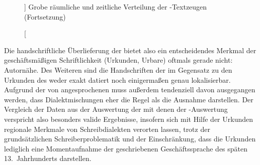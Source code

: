 \begin{figure}
\ContinuedFloat
{}
\caption%
	[]
	{Grobe räumliche und zeitliche Verteilung der \KC{}-Textzeugen
		(Fortsetzung)\nocite{wiesinger1983:rede}
	}
\end{figure}

Die handschriftliche Überlieferung der \KC{} bietet also ein
entscheidendes Merkmal der geschäftsmäßigen Schriftlichkeit (Urkunden, Urbare)
oftmals gerade nicht: Autornähe. Des Weiteren sind die Handschriften der
\KC{} im Gegensatz zu den Urkunden des \CAO{} weder exakt datiert
noch einigermaßen genau lokalisierbar. Aufgrund der von
\citet[1310]{wegera2000} angesprochenen  muss außerdem
tendenziell davon ausgegangen werden, dass Dialekt\-mischungen eher die Regel
als die Ausnahme darstellen. Der Vergleich der Daten aus der Auswertung der
\KC{} mit denen der \CAO{}-Auswertung verspricht also besonders
valide Ergebnisse, insofern sich mit Hilfe der Urkunden regionale Merkmale von
Schreibdialekten verorten lassen, trotz der grundsätzlichen
Schreiberproblematik und der Einschränkung, dass die Urkunden lediglich eine
Momentaufnahme der geschriebenen Geschäftssprache des späten 13.~Jahrhunderts
darstellen.

